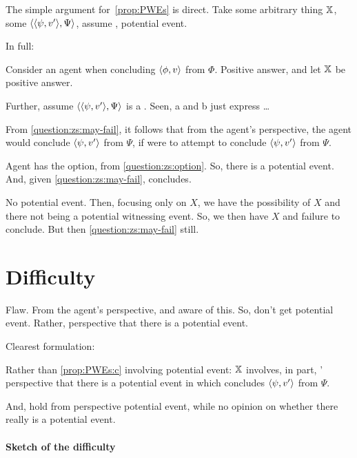 \begin{note}
  The simple argument for~\autoref{prop:PWEs} is direct.
  Take some arbitrary thing \(\qzSaV{}\), some \(\pvp{\psi}{v'}{\Psi}\), assume \requ{}, potential event.

  In full:


  Consider an agent when concluding \(\pv{\phi}{v}\) from \(\Phi\).
  Positive answer, and let \(\qzSaV{}\) be positive answer.

  Further, assume \(\pvp{\psi}{v'}{\Psi}\) is a \requ{}.
  { \color{red} Seen, a and b just express \requ{}\dots}

  From \qzS{} \ref{question:zs:may-fail}, it follows that from the agent's perspective, the agent would conclude \(\pv{\psi}{v'}\) from \(\Psi\), if \vAgent{} were to attempt to conclude \(\pv{\psi}{v'}\) from \(\Psi\).

  Agent has the option, from \ref{question:zs:option}.
  So, there is a potential event.
  And, given \ref{question:zs:may-fail}, concludes.
\end{note}

\begin{note}
  No potential event.
  Then, focusing only on \(X\), we have the possibility of \(X\) and there not being a potential witnessing event.
  So, we then have \(X\) and failure to conclude.
  But then \ref{question:zs:may-fail} still.
\end{note}

\section{Difficulty}

\begin{note}
  Flaw.
  From the agent's perspective, and aware of this.
  So, don't get potential event.
  Rather, perspective that there is a potential event.

  Clearest formulation:

  Rather than \ref{prop:PWEs:c} involving potential event:
  {
    \color{red}
    \(\qzSaV{}\) involves, in part, \vAgent{}' perspective that there is a potential event in which \vAgent{} concludes \(\pv{\psi}{v'}\) from \(\Psi\).
  }

  And, hold from perspective potential event, while no opinion on whether there really is a potential event.
\end{note}

\paragraph{Sketch of the difficulty}

